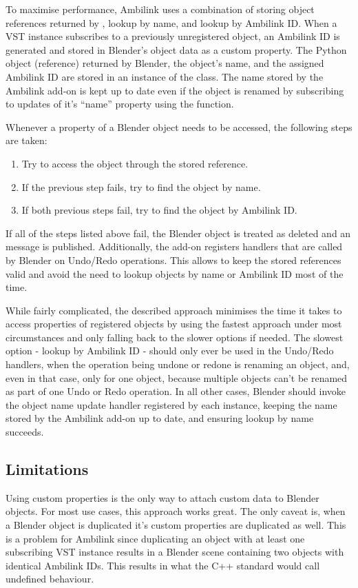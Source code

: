 To maximise performance, Ambilink uses a combination of storing object references returned by 
, lookup by name, and lookup by Ambilink ID.
When a VST instance subscribes to a previously unregistered object, an Ambilink ID is generated
and stored in Blender's object data as a custom property.
The Python object (reference) returned by Blender, the object's name, and the assigned Ambilink ID are stored
in an instance of the  class. The name stored by the Ambilink add-on is kept up to date 
even if the object is renamed by subscribing to updates of it's ``name'' property 
using the  function.
\begin{samepage}
Whenever a property of a Blender object needs to be accessed, the following steps are taken:
\begin{enumerate}
    \item Try to access the object through the stored reference.
    \item If the previous step fails, try to find the object by name.
    \item If both previous steps fail, try to find the object by Ambilink ID.
\end{enumerate}
\end{samepage}
If all of the steps listed above fail, the Blender object is treated as deleted and an  message is published.
Additionally, the add-on registers handlers that are called by Blender on Undo/Redo operations.
This allows to keep the stored references valid and avoid the need to lookup objects by name or Ambilink ID most of the time.

While fairly complicated, the described approach minimises the time it takes to access properties of registered objects
by using the fastest approach under most circumstances and only falling back to the slower options if needed.
The slowest option - lookup by Ambilink ID - should only ever be used in the Undo/Redo handlers, when the operation
being undone or redone is renaming an object, and, even in that case, only for one object, because multiple 
objects can't be renamed as part of one Undo or Redo operation.
In all other cases, Blender should invoke the object name update handler
registered by each  instance, keeping the name stored by the Ambilink add-on up to date,
and ensuring lookup by name succeeds.

\subsection{Limitations}\label{subsec:blender_addon_limitations}
Using custom properties is the only way to attach custom data to Blender objects. 
For most use cases, this approach works great. The only caveat is, when a Blender object is duplicated 
it's custom properties are duplicated as well. This is a problem for Ambilink since duplicating an object with 
at least one subscribing VST instance results in a Blender scene containing two objects with identical Ambilink IDs. 
This results in what the C++ standard would call undefined behaviour.

